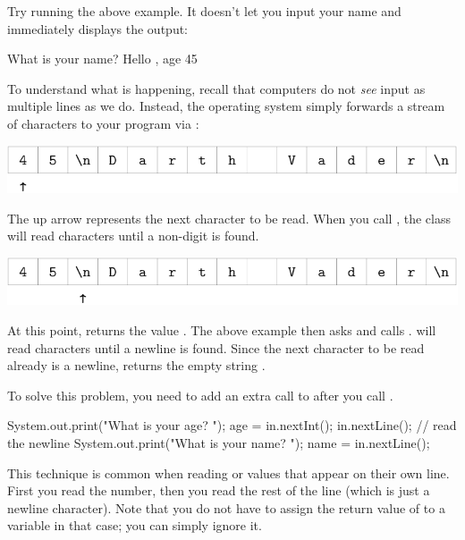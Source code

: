 Try running the above example.
It doesn't let you input your name and immediately displays the output:

\begin{stdout}
    What is your name? Hello , age 45
\end{stdout}

To understand what is happening, recall that computers do not {\em see} input as multiple lines as we do.
Instead, the operating system simply forwards a stream of characters to your program via :

\begin{center}
\includegraphics{vader1.pdf}
\end{center}

The up arrow represents the next character to be read.
When you call , the  class will read characters until a non-digit is found.

\begin{center}
\includegraphics{vader2.pdf}
\end{center}

At this point,  returns the value .
The above example then asks  and calls .
 will read characters until a newline is found.
Since the next character to be read already is a newline,  returns the empty string .

To solve this problem, you need to add an extra call to  after you call .

\begin{code}
    System.out.print("What is your age? ");
    age = in.nextInt();
    in.nextLine();  // read the newline
    System.out.print("What is your name? ");
    name = in.nextLine();
\end{code}

This technique is common when reading  or  values that appear on their own line.
First you read the number, then you read the rest of the line (which is just a newline character).
Note that you do not have to assign the return value of  to a variable in that case; you can simply ignore it.
